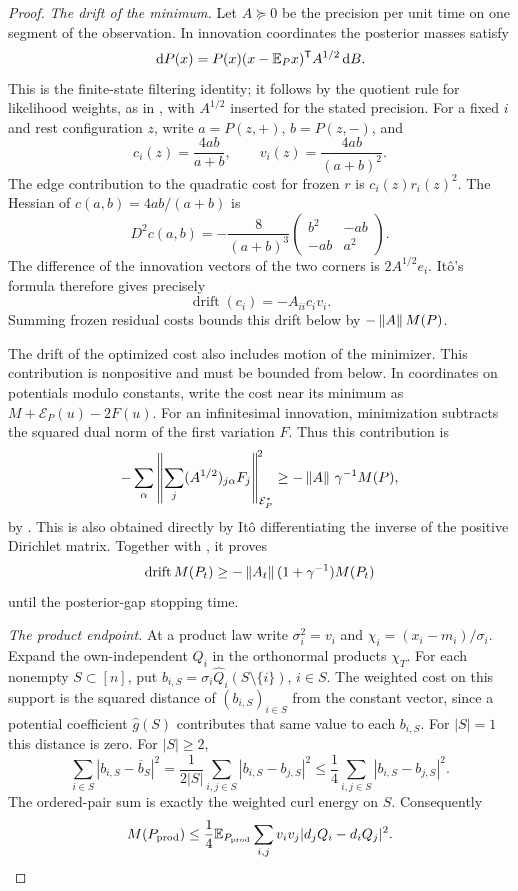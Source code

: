 \begin{proof}
\emph{The drift of the minimum.}
Let $A\succeq0$ be the precision per unit time on one segment of the
observation.  In innovation coordinates the posterior masses satisfy
\[
 \,\mathrm d P(x)=P(x)(x-\mathbb E_Px)^{\mathsf T}A^{1/2}\,\mathrm d B.
\]
This is the finite-state filtering identity; it follows by the quotient
rule for likelihood weights, as in \cite[Equation~(2.1)]{SKGap}, with $A^{1/2}$ inserted for the stated precision.
For a fixed $i$ and rest configuration $z$, write
$a=P(z,+)$, $b=P(z,-)$, and
\[
 c_i(z)=\frac{4ab}{a+b},\qquad
 v_i(z)=\frac{4ab}{(a+b)^2}.
\]
The edge contribution to the quadratic cost for frozen $r$ is
$c_i(z)r_i(z)^2$.  The Hessian of $c(a,b)=4ab/(a+b)$ is
\[
 D^2c(a,b)=-\frac8{(a+b)^3}
 \begin{pmatrix}b^2&-ab\\-ab&a^2\end{pmatrix}.
\]
The difference of the innovation vectors of the two corners is
$2A^{1/2}e_i$.  It\^o's formula therefore gives precisely
\begin{equation}\label{eq:exact-edge-drift}
 \operatorname{drift}(c_i)=-A_{ii}c_iv_i.
\end{equation}
Summing frozen residual costs bounds this drift below by
$-\left\lVert A\right\rVert M(P)$.

The drift of the optimized cost also includes motion of the minimizer.
This contribution is nonpositive and must be bounded from below.  In
coordinates on potentials modulo constants, write the cost near its
minimum as
$M+\mathcal E_P(u)-2F(u)$.
For an infinitesimal innovation, minimization subtracts the squared
dual norm of the first variation $F$.  Thus this contribution is
\[
 -\sum_\alpha\left\lVert 
     \sum_j(A^{1/2})_{j\alpha}F_j
     \right\rVert_{\mathcal E_P^*}^{\!2}
 \ge-\left\lVert A\right\rVert\,\gamma^{-1}M(P),
\]
by .  This is also obtained directly by
It\^o differentiating the inverse of the positive Dirichlet matrix.
Together with , it proves
\begin{equation}\label{eq:exact-minimum-drift}
 \operatorname{drift}M(P_t)
 \ge-\left\lVert A_t\right\rVert(1+\gamma^{-1})M(P_t)
\end{equation}
until the posterior-gap stopping time.

\emph{The product endpoint.}
At a product law write $\sigma_i^2=v_i$ and
$\chi_i=(x_i-m_i)/\sigma_i$.  Expand the own-independent $Q_i$ in the
orthonormal products $\chi_T$.  For each nonempty $S\subset[n]$, put
$b_{i,S}=\sigma_i\widehat Q_i(S\setminus\{i\})$, $i\in S$.
The weighted cost on this support is the squared distance of
$(b_{i,S})_{i\in S}$ from the constant vector, since a potential
coefficient $\widehat g(S)$ contributes that same value to each
$b_{i,S}$.  For $|S|=1$ this distance is zero.  For $|S|\ge2$,
\[
 \sum_{i\in S}|b_{i,S}-\overline b_S|^2
 =\frac1{2|S|}\sum_{i,j\in S}|b_{i,S}-b_{j,S}|^2
 \le\frac14\sum_{i,j\in S}|b_{i,S}-b_{j,S}|^2.
\]
The ordered-pair sum is exactly the weighted curl energy on $S$.
Consequently
\begin{equation}\label{eq:exact-product-hodge}
 M(P_{\rm prod})\le\frac14\mathbb E_{P_{\rm prod}}
       \sum_{i,j}v_iv_j|d_jQ_i-d_iQ_j|^2.
\end{equation}


\end{proof}
